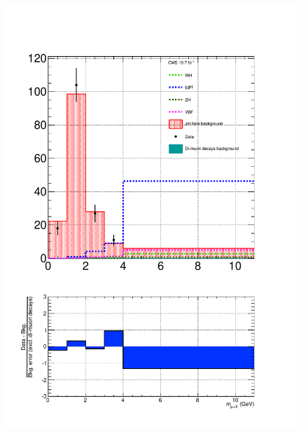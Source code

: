 
\begin{figure}[hbtp]
  \begin{center}
    \includegraphics[width=\cmsFigWidth]{figures/final_lowMT_linear_v93}
    \hspace{1mm}

\end{center}
\end{figure}
